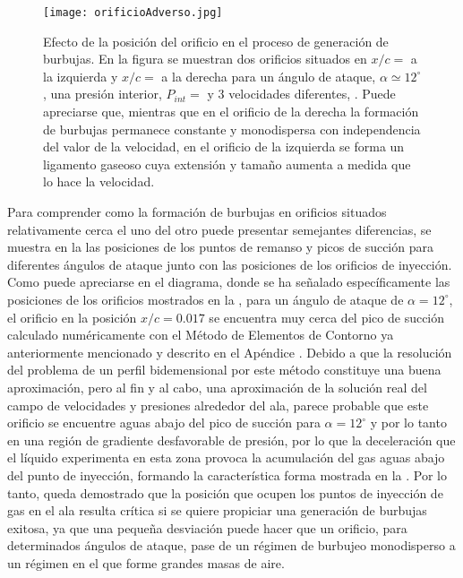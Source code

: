 \begin{figure}
\centering
\texttt{[image: orificioAdverso.jpg]}
\caption{Efecto de la posición del orificio en el proceso de generación de burbujas. En la figura se muestran dos orificios situados en $x/c = $ a la izquierda y $x/c = $ a la derecha %
para un ángulo de ataque, $\alpha \simeq 12^{\circ}$, una presión interior, $P_{int} = $ %
y 3 velocidades diferentes, %
. Puede apreciarse que, mientras que en el orificio de la derecha la formación de burbujas permanece constante y monodispersa con independencia del valor de la velocidad, en el orificio de la izquierda se forma un ligamento gaseoso cuya extensión y tamaño aumenta a medida que lo hace la velocidad. }
\end{figure}

Para comprender como la formación de burbujas en orificios situados relativamente cerca el uno del otro puede presentar semejantes diferencias, se muestra en la  las posiciones de los puntos de remanso y picos de succión para diferentes ángulos de ataque junto con las posiciones de los orificios de inyección. Como puede apreciarse en el diagrama, donde se ha señalado específicamente las posiciones de los orificios mostrados en la , para un ángulo de ataque de $\alpha = 12^{\circ}$, el orificio en la posición $x/c = 0.017$ se encuentra muy cerca del pico de succión calculado numéricamente con el Método de Elementos de Contorno ya anteriormente mencionado y descrito en el Apéndice %
. Debido a que la resolución del problema de un perfil bidemensional por este método constituye una buena aproximación, pero al fin y al cabo, una aproximación de la solución real del campo de velocidades y presiones alrededor del ala, parece probable que este orificio se encuentre aguas abajo del pico de succión para $\alpha = 12^{\circ}$ y por lo tanto en una región de gradiente desfavorable de presión, por lo que la deceleración que el líquido experimenta en esta zona provoca la acumulación del gas aguas abajo del punto de inyección, formando la característica forma mostrada en la . Por lo tanto, queda demostrado que la posición que ocupen los puntos de inyección de gas en el ala resulta crítica si se quiere propiciar una generación de burbujas exitosa, ya que una pequeña desviación puede hacer que un orificio, para determinados ángulos de ataque, pase de un régimen de burbujeo monodisperso a un régimen en el que forme grandes masas de aire. 

